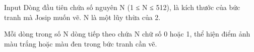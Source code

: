 Input
Dòng đầu tiên chứa số nguyên N (1 ≤ N ≤ 512), là kích thước của bức tranh mà Josip muốn vẽ. N là một lũy thừa của 2.  

   Mỗi dòng trong số N dòng tiếp theo chứa N chữ số 0 hoặc 1, thể hiện điểm ảnh màu trắng hoặc màu đen trong bức tranh cần vẽ.